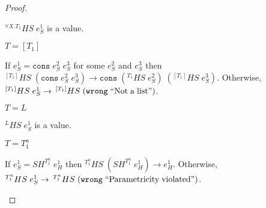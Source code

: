 \begin{hps}
\begin{proof}
\begin{hps-case-14}
\begin{hps-case-14-3}
$^{\forall X.T_{1}}HS\;e_{S}^{1}$ is a value.
\end{hps-case-14-3}
\begin{hps-case-14-4}
$T=[T_{1}]$

If $e_{S}^{1}=\mathtt{cons}\;e_{S}^{2}\;e_{S}^{3}$ for some $e_{S}^{2}$ and $e_{S}^{3}$ then $^{[T_{1}]}HS\;(\mathtt{cons}\;e_{S}^{2}\;e_{S}^{3})\rightarrow\mathtt{cons}\;(^{T_{1}}HS\;e_{S}^{2})\;(^{[T_{1}]}HS\;e_{S}^{3})$.  Otherwise, $^{[T_{1}]}HS\;e_{S}^{1}\rightarrow\,^{[T_{1}]}HS\;(\mathtt{wrong}\;\mathrm{``Not\;a\;list"})$.
\end{hps-case-14-4}
\begin{hps-case-14-5}
$T=L$

$^{L}HS\;e_{S}^{1}$ is a value.
\end{hps-case-14-5}
\begin{hps-case-14-6}
$T=T_{1}^{a}$

If $e_{S}^{1}=SH^{T_{1}^{a}}\;e_{H}^{1}$ then $^{T_{1}^{a}}HS\;(SH^{T_{1}^{a}}\;e_{H}^{1})\rightarrow e_{H}^{1}$.  Otherwise, $^{T_{1}^{a}}HS\;e_{S}^{1}\rightarrow\,^{T_{1}^{a}}HS\;(\mathtt{wrong}\;\mathrm{``Parametricity\;violated"})$.
\end{hps-case-14-6}
\end{hps-case-14}
\end{proof}
\end{hps}